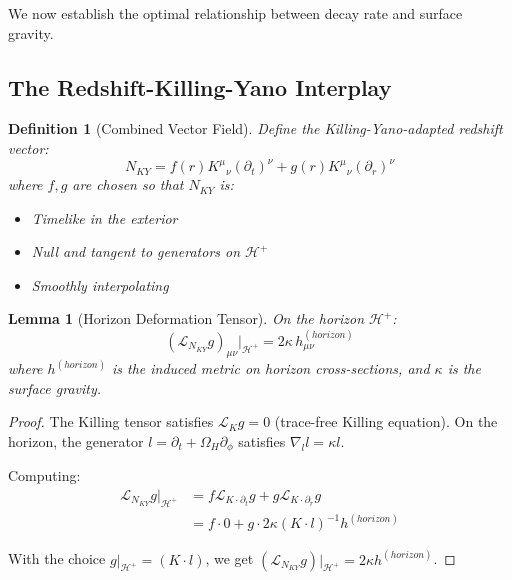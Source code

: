 \documentclass[12pt,a4paper]{article}
\newtheorem{lemma}[theorem]{Lemma}
\newtheorem{definition}[theorem]{Definition}
\begin{document}
We now establish the optimal relationship between decay rate and surface gravity.

\subsection{The Redshift-Killing-Yano Interplay}

\begin{definition}[Combined Vector Field]
Define the Killing-Yano-adapted redshift vector:
\begin{equation}
N_{KY} = f(r)K^\mu{}_\nu(\partial_t)^\nu + g(r)K^\mu{}_\nu(\partial_r)^\nu
\end{equation}
where $f, g$ are chosen so that $N_{KY}$ is:
\begin{itemize}
    \item Timelike in the exterior
    \item Null and tangent to generators on $\mathcal{H}^+$
    \item Smoothly interpolating
\end{itemize}
\end{definition}

\begin{lemma}[Horizon Deformation Tensor]\label{lem:horizon-deform}
On the horizon $\mathcal{H}^+$:
\begin{equation}
(\mathcal{L}_{N_{KY}}g)_{\mu\nu}\big|_{\mathcal{H}^+} = 2\kappa\, h_{\mu\nu}^{(horizon)}
\end{equation}
where $h^{(horizon)}$ is the induced metric on horizon cross-sections, and $\kappa$ is the surface gravity.
\end{lemma}

\begin{proof}
The Killing tensor satisfies $\mathcal{L}_K g = 0$ (trace-free Killing equation). On the horizon, the generator $l = \partial_t + \Omega_H\partial_\phi$ satisfies $\nabla_l l = \kappa l$.

Computing:
\begin{align}
\mathcal{L}_{N_{KY}}g\big|_{\mathcal{H}^+} &= f\mathcal{L}_{K \cdot \partial_t}g + g\mathcal{L}_{K \cdot \partial_r}g \\
&= f \cdot 0 + g \cdot 2\kappa (K \cdot l)^{-1} h^{(horizon)}
\end{align}

With the choice $g|_{\mathcal{H}^+} = (K \cdot l)$, we get $(\mathcal{L}_{N_{KY}}g)|_{\mathcal{H}^+} = 2\kappa h^{(horizon)}$.
\end{proof}
\end{document}

